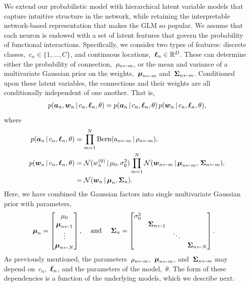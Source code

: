 We extend our probabilistic model with hierarchical latent variable
models that capture intuitive structure in the network, while
retaining the interpretable network-based representation that makes
the GLM so popular. We assume that each neuron is endowed with a set
of latent features that govern the probability of functional
interactions. Specifically, we consider two types of features:
discrete classes,~$c_n \in \{1, \ldots, C\}$, and continuous
locations,~$\boldsymbol{\ell}_n \in \mathbb{R}^D$. These can determine either the
probability of connection,~$\rho_{n \leftarrow m}$, or the mean and
variance of a multivariate Gaussian prior on the
weights,~$\boldsymbol{\mu}_{n \leftarrow m}$ and~$\boldsymbol{\Sigma}_{n \leftarrow m}$.
Conditioned upon these latent variables, the connections and 
their weights are all conditionally independent of one another.
That is,
\begin{align}
  p(\boldsymbol{a}_n, \boldsymbol{w}_n \,|\, c_n, \boldsymbol{\ell}_n, \theta) = 
  p(\boldsymbol{a}_n \,|\, c_n, \boldsymbol{\ell}_n, \theta) \, p(\boldsymbol{w}_n \,|\, c_n, \boldsymbol{\ell}_n, \theta),
\end{align}
where
\begin{align}
  p(\boldsymbol{a}_n \,|\, c_n, \boldsymbol{\ell}_n, \theta) 
  &= \prod_{m=1}^N \mathrm{Bern}(a_{n \leftarrow m} \,|\, \rho_{n \leftarrow m}), \\
  p(\boldsymbol{w}_n \,|\, c_n, \boldsymbol{\ell}_n, \theta) 
  &= \mathcal{N}(w_n^{(0)} \,|\, \mu_0, \sigma^2_0 ) \prod_{m=1}^N 
     \mathcal{N}(\boldsymbol{w}_{n \leftarrow m} \,|\, \boldsymbol{\mu}_{n \leftarrow m}, \, \boldsymbol{\Sigma}_{n \leftarrow m}), \\
  &= \mathcal{N}(\boldsymbol{w}_n \,|\, \boldsymbol{\mu}_n, \boldsymbol{\Sigma}_n).
\end{align}
Here, we have combined the Gaussian factors into single multivariate Gaussian prior
with parameters,
\begin{align}
  \boldsymbol{\mu}_n 
    &= \begin{bmatrix}
      \mu_0 \\
      \boldsymbol{\mu}_{n \leftarrow 1} \\
      \vdots \\
      \boldsymbol{\mu}_{n \leftarrow N}
    \end{bmatrix}, & \text{ and } & &
  \boldsymbol{\Sigma}_n 
  &= \begin{bmatrix}
    \sigma_0^2 &                     &        & \\
               & \boldsymbol{\Sigma}_{n \leftarrow 1} &        & \\
               &                     & \ddots & \\
               &                     &        & \boldsymbol{\Sigma}_{n \leftarrow N} 
    \end{bmatrix}.
\end{align}
As previously mentioned, the parameters~$\rho_{n \leftarrow m}$,~$\boldsymbol{\mu}_{n \leftarrow m}$, and~$\boldsymbol{\Sigma}_{n \leftarrow m}$ 
may depend on~$c_n$,~$\boldsymbol{\ell}_n$, and the parameters of the model,~$\theta$.
The form of these dependencies is a function of the underlying models, 
which we describe next.

